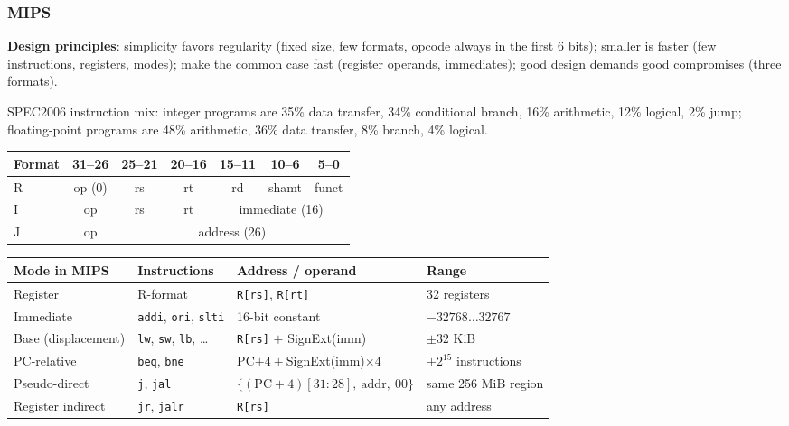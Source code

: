 \subsubsection{MIPS}
\textbf{Design principles}: simplicity favors regularity (fixed size, few
formats, opcode always in the first 6 bits); smaller is faster (few
instructions, registers, modes); make the common case fast (register operands,
immediates); good design demands good compromises (three formats).

SPEC2006 instruction mix: integer programs are 35\% data transfer, 34\%
conditional branch, 16\% arithmetic, 12\% logical, 2\% jump; floating-point
programs are 48\% arithmetic, 36\% data transfer, 8\% branch, 4\% logical.

\begin{center}
\small
\begin{tabular}{@{}lcccccc@{}}
\toprule
Format & 31--26 & 25--21 & 20--16 & 15--11 & 10--6 & 5--0 \\
\midrule
R & op (0) & rs & rt & rd & shamt & funct \\
I & op & rs & rt & \multicolumn{3}{c}{immediate (16)} \\
J & op & \multicolumn{5}{c}{address (26)} \\
\bottomrule
\end{tabular}
\end{center}

\begin{center}
\footnotesize
\begin{tabular}{@{}llll@{}}
\toprule
Mode in MIPS & Instructions & Address / operand & Range \\
\midrule
Register & R-format & \texttt{R[rs]}, \texttt{R[rt]} & 32 registers \\
Immediate & \texttt{addi}, \texttt{ori}, \texttt{slti} & 16-bit constant & $-32768\ldots32767$ \\
Base (displacement) & \texttt{lw}, \texttt{sw}, \texttt{lb}, \dots & \texttt{R[rs]} $+$ SignExt(imm) & $\pm32$ KiB \\
PC-relative & \texttt{beq}, \texttt{bne} & PC$+4+$SignExt(imm)$\times4$ & $\pm2^{15}$ instructions \\
Pseudo-direct & \texttt{j}, \texttt{jal} & $\{(\text{PC}{+}4)[31{:}28],\ \text{addr},\ 00\}$ & same 256 MiB region \\
Register indirect & \texttt{jr}, \texttt{jalr} & \texttt{R[rs]} & any address \\
\bottomrule
\end{tabular}
\end{center}

